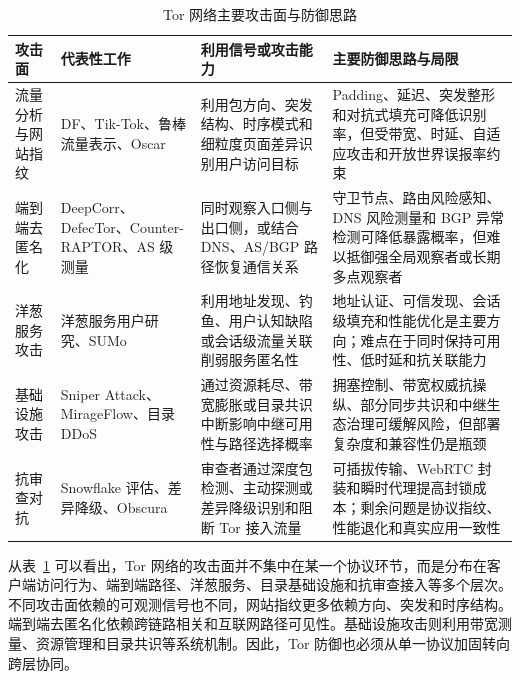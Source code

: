 \begin{table}[htbp]
\centering
\scriptsize
\caption{Tor 网络主要攻击面与防御思路}
\label{tab:tor_attack_defense_summary}
\renewcommand{\arraystretch}{1.25}
\begin{tabular}{p{} p{} p{} p{}}
\hline
\textbf{攻击面} & \textbf{代表性工作} & \textbf{利用信号或攻击能力} & \textbf{主要防御思路与局限} \\
\hline
流量分析与网站指纹 & DF、Tik-Tok、鲁棒流量表示、Oscar\cite{sirinam2018deep,rahman2019tik,shen2023subverting,zhao2024towards} & 利用包方向、突发结构、时序模式和细粒度页面差异识别用户访问目标 & Padding、延迟、突发整形和对抗式填充可降低识别率，但受带宽、时延、自适应攻击和开放世界误报率约束 \\
\hline
端到端去匿名化 & DeepCorr、DefecTor、Counter-RAPTOR、AS 级测量\cite{nasr2018deepcorr,greschbach2016effect,sun2017counter,gegenhuber2023extended} & 同时观察入口侧与出口侧，或结合 DNS、AS/BGP 路径恢复通信关系 & 守卫节点、路由风险感知、DNS 风险测量和 BGP 异常检测可降低暴露概率，但难以抵御强全局观察者或长期多点观察者 \\
\hline
洋葱服务攻击 & 洋葱服务用户研究、SUMo\cite{winter2018tor,lopes2024flow} & 利用地址发现、钓鱼、用户认知缺陷或会话级流量关联削弱服务匿名性 & 地址认证、可信发现、会话级填充和性能优化是主要方向；难点在于同时保持可用性、低时延和抗关联能力 \\
\hline
基础设施攻击 & Sniper Attack、MirageFlow、目录 DDoS\cite{jansen2014sniper,sendner2024mirageflow,luo2026five} & 通过资源耗尽、带宽膨胀或目录共识中断影响中继可用性与路径选择概率 & 拥塞控制、带宽权威抗操纵、部分同步共识和中继生态治理可缓解风险，但部署复杂度和兼容性仍是瓶颈 \\
\hline
抗审查对抗 & Snowflake 评估、差异降级、Obscura\cite{macmillan2020evaluating,sun2024differential,vilalonga2026obscura} & 审查者通过深度包检测、主动探测或差异降级识别和阻断 Tor 接入流量 & 可插拔传输、WebRTC 封装和瞬时代理提高封锁成本；剩余问题是协议指纹、性能退化和真实应用一致性 \\
\hline
\end{tabular}
\end{table}

从表~\ref{tab:tor_attack_defense_summary} 可以看出，Tor 网络的攻击面并不集中在某一个协议环节，而是分布在客户端访问行为、端到端路径、洋葱服务、目录基础设施和抗审查接入等多个层次。不同攻击面依赖的可观测信号也不同，网站指纹更多依赖方向、突发和时序结构。端到端去匿名化依赖跨链路相关和互联网路径可见性。基础设施攻击则利用带宽测量、资源管理和目录共识等系统机制。因此，Tor 防御也必须从单一协议加固转向跨层协同。

